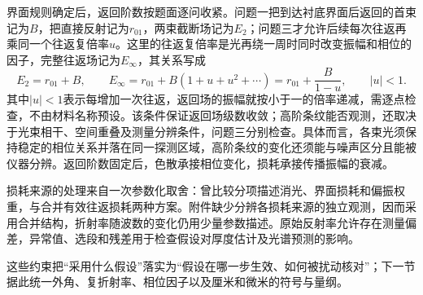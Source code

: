 界面规则确定后，返回阶数按题面逐问收紧。问题一把到达衬底界面后返回的首束记为$B$，把直接反射记为$r_{01}$，两束截断场记为$E_2$；问题三才允许后续每次往返再乘同一个往返复倍率$u$。这里的往返复倍率是光再绕一周时同时改变振幅和相位的因子，完整往返场记为$E_\infty$，其关系写成
\begin{equation}
E_2=r_{01}+B,\qquad E_\infty=r_{01}+B(1+u+u^2+\cdots)=r_{01}+\frac{B}{1-u},\qquad |u|<1 .
\end{equation}
其中$|u|<1$表示每增加一次往返，返回场的振幅就按小于一的倍率递减，需逐点检查，不由材料名称预设。该条件保证返回场级数收敛；高阶条纹能否观测，还取决于光束相干、空间重叠及测量分辨条件，问题三分别检查。具体而言，各束光须保持稳定的相位关系并落在同一探测区域，高阶条纹的变化还须能与噪声区分且能被仪器分辨。返回阶数固定后，色散承接相位变化，损耗承接传播振幅的衰减。

损耗来源的处理来自一次参数化取舍：曾比较分项描述消光、界面损耗和偏振权重，与合并有效往返损耗两种方案。附件缺少分辨各损耗来源的独立观测，因而采用合并结构，折射率随波数的变化仍用少量参数描述。原始反射率允许存在测量偏差，异常值、选段和残差用于检查假设对厚度估计及光谱预测的影响。

这些约束把“采用什么假设”落实为“假设在哪一步生效、如何被扰动核对”；下一节据此统一外角、复折射率、相位因子以及厘米和微米的符号与量纲。
